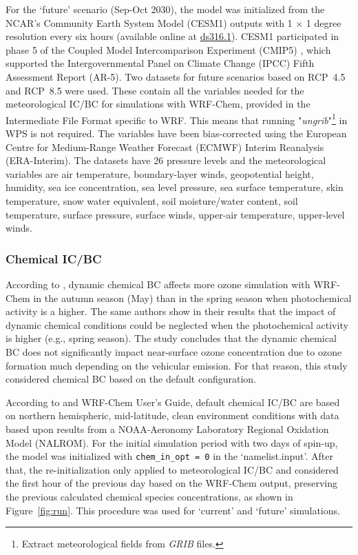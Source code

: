 		For the `future' scenario (Sep-Oct 2030), the model was initialized from the NCAR's Community Earth System Model (CESM1) outputs with 1 $\times$ 1 degree resolution every six hours (available online at \href{https://rda.ucar.edu/datasets/ds316.1/}{ds316.1}).
		CESM1 participated in phase 5 of the Coupled Model Intercomparison Experiment (CMIP5) \citep{Monaghan2014}, which supported the Intergovernmental Panel on Climate Change (IPCC) Fifth Assessment Report (AR-5).
		Two datasets for future scenarios based on RCP~4.5 and RCP~8.5 were used.
		These contain all the variables needed for the meteorological IC/BC for simulations with WRF-Chem, provided in the Intermediate File Format specific to WRF. This means that running "{\it ungrib}"\footnote{Extract meteorological fields from {\it GRIB} files.} in WPS is not required.
		The variables have been bias-corrected using the European Centre for Medium-Range Weather Forecast (ECMWF) Interim Reanalysis (ERA-Interim).
		The datasets have 26 pressure levels and the meteorological variables are air temperature, boundary-layer winds, geopotential height, humidity, sea ice concentration, sea level pressure, sea surface temperature, skin temperature, snow water equivalent, soil moisture/water content, soil temperature, surface pressure, surface winds, upper-air temperature, upper-level winds.
		
		\subsubsection{Chemical IC/BC}
		According to \citet{Gavidia2018}, dynamic chemical BC affects more ozone simulation with WRF-Chem in the autumn season (May) than in the spring season when photochemical activity is a higher. 
		The same authors show in their results that the impact of dynamic chemical conditions could be neglected when the photochemical activity is higher (e.g., spring season).
		The study concludes that the dynamic chemical BC does not significantly impact near-surface ozone concentration due to ozone formation much depending on the vehicular emission.
		For that reason, this study considered chemical BC based on the default configuration.
		
		According to \citet{Grell2005} and WRF-Chem User's Guide, default chemical IC/BC are based on northern hemispheric, mid-latitude, clean environment conditions with data based upon results from a NOAA-Aeronomy Laboratory Regional Oxidation Model (NALROM).
		For the initial simulation period with two days of spin-up, the model was initialized with \verb|chem_in_opt = 0| in the `namelist.input'.
		After that, the re-initialization only applied to meteorological IC/BC and considered the first hour of the previous day based on the WRF-Chem output, preserving the previous calculated chemical species concentrations, as shown in Figure~\ref{fig:run}.
		This procedure was used for `current' and `future' simulations.

